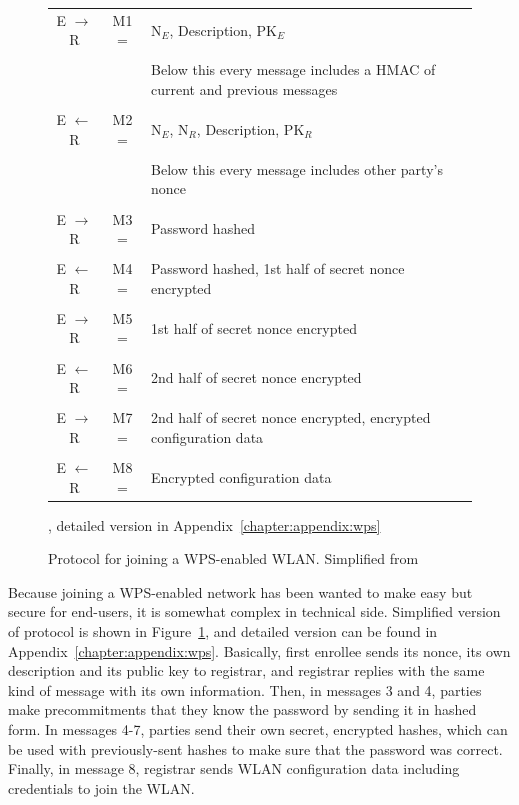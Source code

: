\documentclass[12pt,a4paper,oneside,pdftex]{report}
\begin{document}
\begin{figure}
\label{tab:wps}
\begin{tabular}{c|c p{10cm}}
    \hline

    E $\rightarrow$ R & M1 = & N$_E$, Description, PK$_E$ \\\\

    &  & Below this every message includes a HMAC of current and previous messages \\
    \hline \\

    E $\leftarrow$ R & M2 = & N$_E$, N$_R$, Description, PK$_R$ \\\\

    &  & Below this every message includes other party's nonce \\
    \hline \\

    E $\rightarrow$ R & M3 = & Password hashed \\\\

    E $\leftarrow$ R & M4 = & Password hashed, 1st half of secret nonce encrypted \\\\

    E $\rightarrow$ R & M5 = & 1st half of secret nonce encrypted \\\\

    E $\leftarrow$ R & M6 = & 2nd half of secret nonce encrypted \\\\

    E $\rightarrow$ R & M7 = & 2nd half of secret nonce encrypted, encrypted configuration data \\\\

    E $\leftarrow$ R & M8 = & Encrypted configuration data \\
    \hline
\end{tabular}
\caption{Protocol for joining a WPS-enabled WLAN. Simplified from~\cite{microsoftWCN}}, detailed version in Appendix~\ref{chapter:appendix:wps}
\end{figure}

Because joining a WPS-enabled network has been wanted to make easy but secure for end-users, it is somewhat complex in technical side. Simplified version of protocol is shown in Figure~\ref{tab:wps}, and detailed version can be found in Appendix~\ref{chapter:appendix:wps}. Basically, first enrollee sends its nonce, its own description and its public key to registrar, and registrar replies with the same kind of message with its own information. Then, in messages 3 and 4, parties make precommitments that they know the password by sending it in hashed form. In messages 4-7, parties send their own secret, encrypted hashes, which can be used with previously-sent hashes to make sure that the password was correct. Finally, in message 8, registrar sends WLAN configuration data including credentials to join the WLAN.
\end{document}
